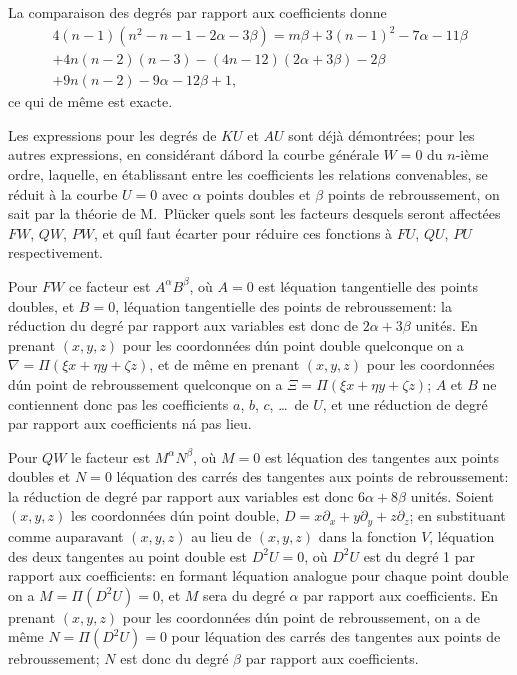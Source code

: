 \documentclass[11pt,a4paper]{article}
\theoremstyle{plain}
\begin{document}
La comparaison des degr\'es par rapport aux coefficients donne
\begin{multline*}
4(n-1)(n^2-n-1-2\alpha-3\beta) = m\beta + 3(n-1)^2 - 7\alpha - 11\beta \\
+ 4n(n-2)(n-3) - (4n-12)(2\alpha+3\beta) - 2\beta\\
+ 9n(n-2) - 9\alpha - 12\beta + 1,
\end{multline*}
ce qui de m\^eme est exacte.

Les expressions pour les degr\'es de $KU$ et $AU$ sont d\'ej\`a d\'emontr\'ees; pour les autres expressions, en consid\'erant d\'abord la courbe g\'en\'erale $W=0$ du $n$-i\`eme ordre, laquelle, en \'etablissant entre les coefficients les relations convenables, se r\'eduit \`a la courbe $U=0$ avec $\alpha$ points doubles et $\beta$ points de rebroussement, on sait par la th\'eorie de M.~Pl\"ucker quels sont les facteurs desquels seront affect\'ees $FW$, $QW$, $PW$, et qu\'il faut \'ecarter pour r\'eduire ces fonctions \`a $FU$, $QU$, $PU$ respectivement.

Pour $FW$ ce facteur est $A^\alpha B^\beta$, o\`u $A=0$ est l\'equation tangentielle des points doubles, et $B=0$, l\'equation tangentielle des points de rebroussement: la r\'eduction du degr\'e par rapport aux variables est donc de $2\alpha+3\beta$ unit\'es. En prenant $(x, y, z)$ pour les coordonn\'ees d\'un point double quelconque on a $\nabla = \Pi(\xi x + \eta y + \zeta z)$, et de m\^eme en prenant $(x, y, z)$ pour les coordonn\'ees d\'un point de rebroussement quelconque on a $\Xi = \Pi(\xi x + \eta y + \zeta z)$; $A$ et $B$ ne contiennent donc pas les coefficients $a$, $b$, $c$, \ldots\ de $U$, et une r\'eduction de degr\'e par rapport aux coefficients n\'a pas lieu.

Pour $QW$ le facteur est $M^\alpha N^\beta$, o\`u $M=0$ est l\'equation des tangentes aux points doubles et $N=0$ l\'equation des carr\'es des tangentes aux points de rebroussement: la r\'eduction de degr\'e par rapport aux variables est donc $6\alpha+8\beta$ unit\'es. Soient $(x, y, z)$ les coordonn\'ees d\'un point double, $D = x\partial_x + y\partial_y + z\partial_z$; en substituant comme auparavant $(x, y, z)$ au lieu de $(x, y, z)$ dans la fonction $V$, l\'equation des deux tangentes au point double est $D^2U = 0$, o\`u $D^2U$ est du degr\'e 1 par rapport aux coefficients: en formant l\'equation analogue pour chaque point double on a $M = \Pi(D^2U) = 0$, et $M$ sera du degr\'e $\alpha$ par rapport aux coefficients. En prenant $(x, y, z)$ pour les coordonn\'ees d\'un point de rebroussement, on a de m\^eme $N = \Pi(D^2U) = 0$ pour l\'equation des carr\'es des tangentes aux points de rebroussement; $N$ est donc du degr\'e $\beta$ par rapport aux coefficients.
\end{document}
